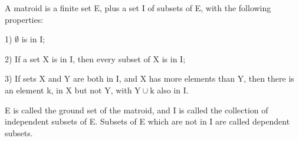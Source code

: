 A matroid is a finite set E, plus a set I of subsets of E, with the following
properties:
\par
1) $\emptyset$ is in I;
\par
2) If a set X is in I, then every subset of X is in I;
\par
3) If sets X and Y are both in I, and X has more elements than Y, then
there is an element k, in X but not Y, with $ \mathrm{Y} \cup { \mathrm{k} } $ also 
in I.
\par
E is called the ground set of the matroid, and I is called the
collection of independent subsets of E. Subsets of E which are not in
I are called dependent subsets.
